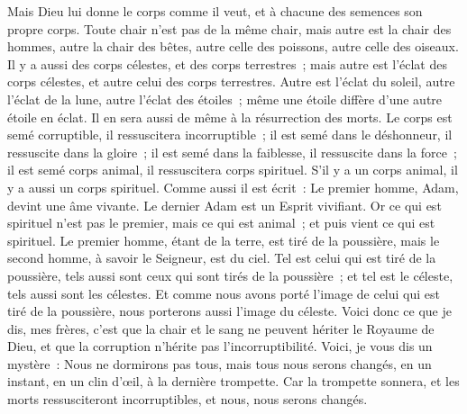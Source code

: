 \begin{multicols}{2}
Mais Dieu lui donne le corps comme il veut, et à chacune des semences son propre corps.
Toute chair n'est pas de la même chair, mais autre est la chair des hommes, autre la chair des bêtes, autre celle des poissons, autre celle des oiseaux.
Il y a aussi des corps célestes, et des corps terrestres~; mais autre est l'éclat des corps célestes, et autre celui des corps terrestres.
Autre est l'éclat du soleil, autre l'éclat de la lune, autre l'éclat des étoiles~; même une étoile diffère d'une autre étoile en éclat.
Il en sera aussi de même à la résurrection des morts. Le corps est semé corruptible, il ressuscitera incorruptible~;
il est semé dans le déshonneur, il ressuscite dans la gloire~; il est semé dans la faiblesse, il ressuscite dans la force~;
il est semé corps animal, il ressuscitera corps spirituel. S'il y a un corps animal, il y a aussi un corps spirituel.
Comme aussi il est écrit~: Le premier homme, Adam, devint une âme vivante. Le dernier Adam est un Esprit vivifiant.
Or ce qui est spirituel n'est pas le premier, mais ce qui est animal~; et puis vient ce qui est spirituel.
Le premier homme, étant de la terre, est tiré de la poussière, mais le second homme, à savoir le Seigneur, est du ciel.
Tel est celui qui est tiré de la poussière, tels aussi sont ceux qui sont tirés de la poussière~; et tel est le céleste, tels aussi sont les célestes.
Et comme nous avons porté l'image de celui qui est tiré de la poussière, nous porterons aussi l'image du céleste.
Voici donc ce que je dis, mes frères, c'est que la chair et le sang ne peuvent hériter le Royaume de Dieu, et que la corruption n'hérite pas l'incorruptibilité.
Voici, je vous dis un mystère~: Nous ne dormirons pas tous, mais tous nous serons changés,
en un instant, en un clin d'œil, à la dernière trompette. Car la trompette sonnera, et les morts ressusciteront incorruptibles, et nous, nous serons changés.

\end{multicols}
